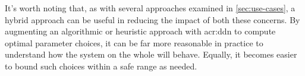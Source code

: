 
It's worth noting that, as with several approaches examined in \cref{sec:use-cases}, a hybrid approach can be useful in reducing the impact of both these concerns.
By augmenting an algorithmic or heuristic approach with \gls{acr:ddn} to compute optimal parameter choices, it can be far more reasonable in practice to understand how the system on the whole will behave.
Equally, it becomes easier to bound such choices within a safe range as needed.

%
%
%
